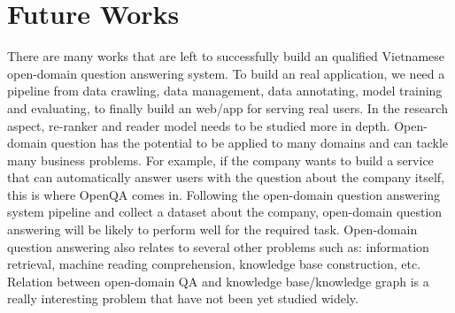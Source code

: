 \documentclass[3p, sort&compress, 12pt]{elsarticle}
\begin{document}
\section{Future Works}
There are many works that are left to successfully build an qualified Vietnamese open-domain question answering system. To build an real application, we need a pipeline from data crawling, data management, data annotating, model training and evaluating, to finally build an web/app for serving real users. In the research aspect, re-ranker and reader model needs to be studied more in depth. Open-domain question has the potential to be applied to many domains and can tackle many business problems. For example, if the company wants to build a service that can automatically answer users with the question about the company itself, this is where OpenQA comes in. Following the open-domain question answering system pipeline and collect a dataset about the company, open-domain question answering will be likely to perform well for the required task. Open-domain question answering also relates to several other problems such as: information retrieval, machine reading comprehension, knowledge base construction, etc. Relation between open-domain QA and knowledge base/knowledge graph is a really interesting problem that have not been yet studied widely.
\newpage


\end{document}
